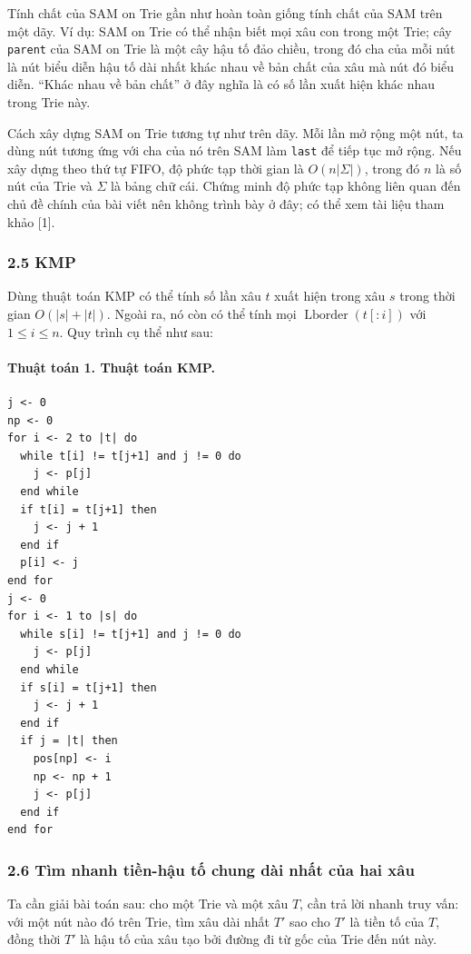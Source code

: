 \documentclass[11pt]{article}
\begin{document}
Tính chất của SAM on Trie gần như hoàn toàn giống tính chất của SAM trên một
dãy. Ví dụ: SAM on Trie có thể nhận biết mọi xâu con trong một Trie; cây
\texttt{parent} của SAM on Trie là một cây hậu tố đảo chiều, trong đó cha của
mỗi nút là nút biểu diễn hậu tố dài nhất khác nhau về bản chất của xâu mà nút
đó biểu diễn. ``Khác nhau về bản chất'' ở đây nghĩa là có số lần xuất hiện khác
nhau trong Trie này.

Cách xây dựng SAM on Trie tương tự như trên dãy. Mỗi lần mở rộng một nút, ta
dùng nút tương ứng với cha của nó trên SAM làm \texttt{last} để tiếp tục mở
rộng. Nếu xây dựng theo thứ tự FIFO, độ phức tạp thời gian là \(O(n|\Sigma|)\),
trong đó \(n\) là số nút của Trie và \(\Sigma\) là bảng chữ cái. Chứng minh độ
phức tạp không liên quan đến chủ đề chính của bài viết nên không trình bày ở
đây; có thể xem tài liệu tham khảo [1].

\subsubsection*{2.5 KMP}

Dùng thuật toán KMP có thể tính số lần xâu \(t\) xuất hiện trong xâu \(s\) trong
thời gian \(O(|s|+|t|)\). Ngoài ra, nó còn có thể tính mọi
\(\operatorname{Lborder}(t[:i])\) với \(1\le i\le n\). Quy trình cụ thể như sau:

\paragraph{Thuật toán 1. Thuật toán KMP.}
\begin{verbatim}
j <- 0
np <- 0
for i <- 2 to |t| do
  while t[i] != t[j+1] and j != 0 do
    j <- p[j]
  end while
  if t[i] = t[j+1] then
    j <- j + 1
  end if
  p[i] <- j
end for
j <- 0
for i <- 1 to |s| do
  while s[i] != t[j+1] and j != 0 do
    j <- p[j]
  end while
  if s[i] = t[j+1] then
    j <- j + 1
  end if
  if j = |t| then
    pos[np] <- i
    np <- np + 1
    j <- p[j]
  end if
end for
\end{verbatim}

\subsubsection*{2.6 Tìm nhanh tiền-hậu tố chung dài nhất của hai xâu}

Ta cần giải bài toán sau: cho một Trie và một xâu \(T\), cần trả lời nhanh truy
vấn: với một nút nào đó trên Trie, tìm xâu dài nhất \(T'\) sao cho \(T'\) là
tiền tố của \(T\), đồng thời \(T'\) là hậu tố của xâu tạo bởi đường đi từ gốc
của Trie đến nút này.
\end{document}
